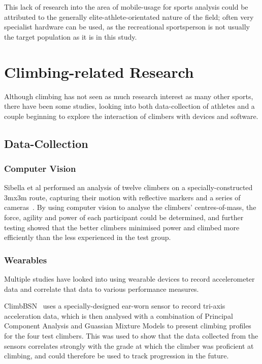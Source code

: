 This lack of research into the area of mobile-usage for sports analysis could be attributed to the generally elite-athlete-orientated nature of the field;
often very specialist hardware can be used, as the recreational sportsperson is not usually the target population as it is in this study.


\section{Climbing-related Research}
Although climbing has not seen as much research interest as many other sports, there have been some studies, looking into both data-collection of athletes and a couple beginning to explore the interaction of climbers with devices and software.


\subsection{Data-Collection}

\subsubsection{Computer Vision}
Sibella et al performed an analysis of twelve climbers on a specially-constructed 3mx3m route, capturing their motion with reflective markers and a series of cameras~\cite{centreofmass}.
By using computer vision to analyse the climbers' centres-of-mass, the force, agility and power of each participant could be determined, and further testing showed that the better climbers minimised power and climbed more efficiently than the less experienced in the test group.



\subsubsection{Wearables}
Multiple studies have looked into using wearable devices to record accelerometer data and correlate that data to various performance measures.

ClimbBSN~\cite{climbbsn} uses a specially-designed ear-worn  sensor to record tri-axis acceleration data, which is then analysed with a combination of Principal Component Analysis and Guassian Mixture Models to present climbing profiles for the four test climbers.
This was used to show that the data collected from the sensors correlates strongly with the grade at which the climber was proficient at climbing, and could therefore be used to track progression in the future.


